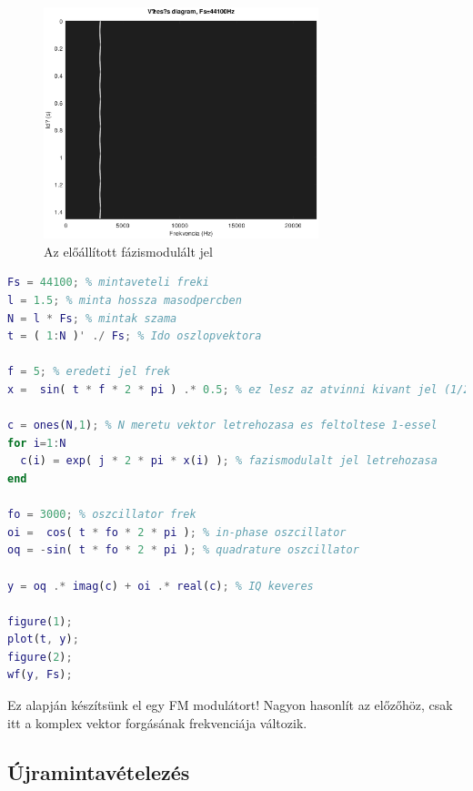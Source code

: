 \documentclass[12pt,a4paper]{article}
\begin{document}
\begin{figure}[H]
\begin{center}
\includegraphics[width=8cm]{figures/modulaciok_workshop_phase.eps}
\caption{Az előállított fázismodulált jel}
\label{fig:phase}
\end{center}
\end{figure}
\clearpage
\begin{lstlisting}[frame=single,language=matlab,caption=Fázismoduláció IQ modulátorral]
Fs = 44100; % mintaveteli freki
l = 1.5; % minta hossza masodpercben
N = l * Fs; % mintak szama
t = ( 1:N )' ./ Fs; % Ido oszlopvektora

f = 5; % eredeti jel frek
x =  sin( t * f * 2 * pi ) .* 0.5; % ez lesz az atvinni kivant jel (1/2 amplitudo)

c = ones(N,1); % N meretu vektor letrehozasa es feltoltese 1-essel
for i=1:N
  c(i) = exp( j * 2 * pi * x(i) ); % fazismodulalt jel letrehozasa
end

fo = 3000; % oszcillator frek
oi =  cos( t * fo * 2 * pi ); % in-phase oszcillator
oq = -sin( t * fo * 2 * pi ); % quadrature oszcillator

y = oq .* imag(c) + oi .* real(c); % IQ keveres

figure(1);
plot(t, y);
figure(2);
wf(y, Fs);
\end{lstlisting}

Ez alapján készítsünk el egy FM modulátort! Nagyon hasonlít az előzőhöz, csak itt a komplex vektor forgásának frekvenciája változik.

\subsection{Újramintavételezés}
\end{document}
